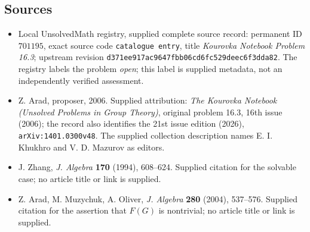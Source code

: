 \documentclass[11pt]{article}
\begin{document}
\subsection{Sources}
\begin{itemize}
\item Local UnsolvedMath registry, supplied complete source record: permanent ID \(701195\), exact source code \texttt{catalogue entry}, title \emph{Kourovka Notebook Problem 16.3}; upstream revision \texttt{d371ee917ac9647fbb06cd6fc529deec6f3dda82}. The registry labels the problem \emph{open}; this label is supplied metadata, not an independently verified assessment.
\item Z. Arad, proposer, 2006. Supplied attribution: \emph{The Kourovka Notebook (Unsolved Problems in Group Theory)}, original problem 16.3, 16th issue (2006); the record also identifies the 21st issue edition (2026), \texttt{arXiv:1401.0300v48}. The supplied collection description names E. I. Khukhro and V. D. Mazurov as editors.
\item J. Zhang, \emph{J. Algebra} \textbf{170} (1994), 608--624. Supplied citation for the solvable case; no article title or link is supplied.
\item Z. Arad, M. Muzychuk, A. Oliver, \emph{J. Algebra} \textbf{280} (2004), 537--576. Supplied citation for the assertion that \(F(G)\) is nontrivial; no article title or link is supplied.
\end{itemize}
\end{document}
